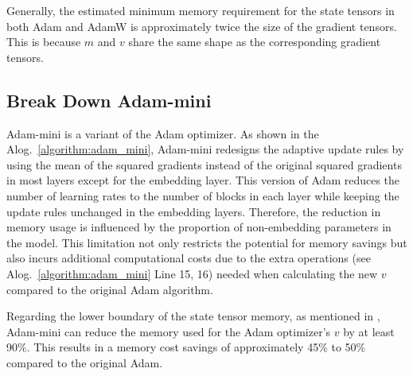 Generally, the estimated minimum memory requirement for the state tensors in both Adam and AdamW is approximately twice the size of the gradient tensors. This is because $m$ and $v$ share the same shape as the corresponding gradient tensors.

\subsection{Break Down Adam-mini}

Adam-mini is a variant of the Adam optimizer. As shown in the Alog.~\ref{algorithm:adam_mini}, Adam-mini redesigns the adaptive update rules by using the mean of the squared gradients instead of the original squared gradients in most layers except for the embedding layer. This version of Adam reduces the number of learning rates to the number of blocks in each layer while keeping the update rules unchanged in the embedding layers. 
Therefore, the reduction in memory usage is influenced by the proportion of non-embedding parameters in the model. This limitation not only restricts the potential for memory savings but also incurs additional computational costs due to the extra operations (see Alog.~\ref{algorithm:adam_mini} Line 15, 16) needed when calculating the new $v$ compared to the original Adam algorithm.

Regarding the lower boundary of the state tensor memory, as mentioned in \cite{zhang2024adamminiusefewerlearning}, Adam-mini can reduce the memory used for the Adam optimizer's $v$ by at least 90\%. This results in a memory cost savings of approximately 45\% to 50\% compared to the original Adam. 

